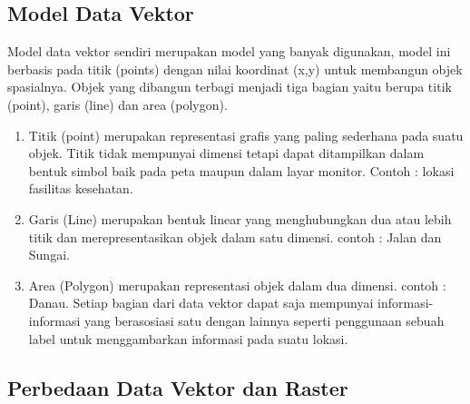 \subsection {Model Data Vektor}
Model data vektor sendiri merupakan model yang banyak digunakan, model ini berbasis pada titik (points) dengan nilai koordinat (x,y) untuk membangun objek spasialnya. Objek yang dibangun terbagi menjadi tiga bagian yaitu berupa titik (point), garis (line) dan area (polygon).
\begin{enumerate}
\item Titik (point) merupakan representasi grafis yang paling sederhana pada suatu objek. Titik tidak mempunyai dimensi tetapi dapat ditampilkan dalam bentuk simbol baik pada peta maupun dalam layar monitor. Contoh : lokasi fasilitas kesehatan.
\item Garis (Line) merupakan bentuk linear yang menghubungkan dua atau lebih titik dan merepresentasikan objek dalam satu dimensi. contoh : Jalan dan Sungai.
\item Area (Polygon) merupakan representasi objek dalam dua dimensi. contoh : Danau.
Setiap bagian dari data vektor dapat saja mempunyai informasi-informasi yang berasosiasi satu dengan lainnya seperti penggunaan sebuah label untuk menggambarkan informasi pada suatu lokasi.
\end{enumerate} 

\subsection {Perbedaan Data Vektor dan Raster}


